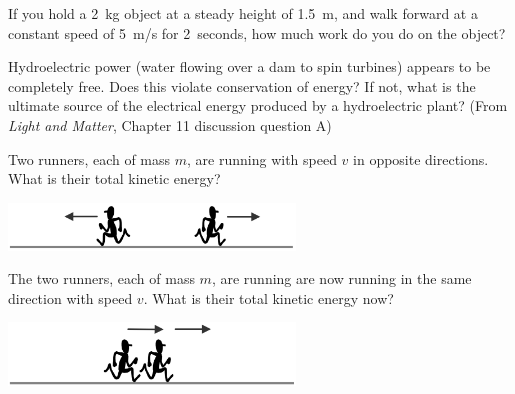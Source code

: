 \documentclass[12pt]{exam}
\begin{document}
\begin{questions}
\question If you hold a 2~kg object at a steady height of 1.5~m, and walk forward at a constant speed of 5~m/s for 2~seconds, how much work do you do on the object?
\vspace{2in}

\question Hydroelectric power (water flowing over a dam to spin turbines) appears to be completely free. Does this violate conservation of energy? If not, what is the ultimate source of the electrical energy produced by a hydroelectric plant? (From \textit{Light and Matter}, Chapter 11 discussion question A)
\vspace{3in}

\clearpage

\question Two runners, each of mass $m$, are running with speed $v$ in opposite directions. What is their total kinetic energy?
\begin{center}
\includegraphics[width=3in]{../images/runnersOpposite.png}
\end{center}
	
\question The two runners, each of mass $m$, are running are now running in the same direction with speed $v$. What is their total kinetic energy now?
\begin{center}
\includegraphics[width=3in]{../images/runnersSame.png}
\end{center}
	\begin{parts}

\end{parts}
\end{questions}
\end{document}
